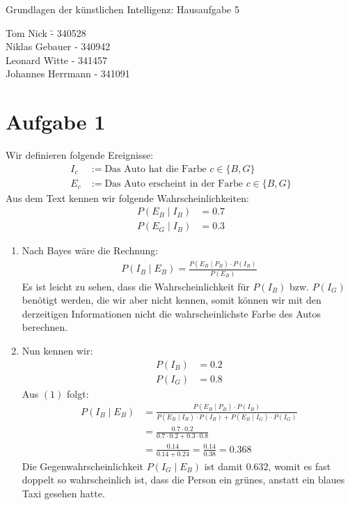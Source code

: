 \documentclass[a4paper,10pt]{article}
\begin{document}
\begin{center}
\Large{Grundlagen der künstlichen Intelligenz: Hausaufgabe 5} \\
\end{center}
\begin{tabbing}
Tom Nick \hspace{2cm}\= - 340528\\
Niklas Gebauer \> - 340942 \\
Leonard Witte \> - 341457 \\
Johannes Herrmann \> - 341091\\
\end{tabbing}

\section*{Aufgabe 1}
    Wir definieren folgende Ereignisse:
    \begin{align*}
        I_c &:= \text{Das Auto hat die Farbe $c \in \{B,G\}$} \\
        E_c &:= \text{Das Auto erscheint in der Farbe $c \in \{B, G\}$}
    \end{align*}
    Aus dem Text kennen wir folgende Wahrscheinlichkeiten:
    \begin{align*}
        P(E_B \mid I_B) &= 0.7 \\
        P(E_G \mid I_B) &= 0.3
    \end{align*}
    \begin{enumerate}[~~a.)]
        \item Nach Bayes wäre die Rechnung:
        \begin{align}
            P(I_B \mid E_B) = \frac{P(E_B\mid P_B) \cdot P(I_B)}{P(E_B)}
        \end{align}
        Es ist leicht zu sehen, dass die Wahrscheinlichkeit für $P(I_B)$ bzw. $P(I_G)$ benötigt werden, die wir aber nicht kennen, somit können wir mit den derzeitigen Informationen nicht die wahrscheinlichste Farbe des Autos berechnen.
        \item Nun kennen wir:
        \begin{align*}
            P(I_B) &= 0.2 \\
            P(I_G) &= 0.8
        \end{align*}
        Aus $(1)$ folgt:
        \begin{align*}
            P(I_B \mid E_B) &= \frac{P(E_B\mid P_B) \cdot P(I_B)}{P(E_B \mid I_B) \cdot P(I_B) + P(E_B \mid I_G) \cdot P(I_G)} \\
            &= \frac{0.7 \cdot 0.2}{0.7 \cdot 0.2 + 0.3 \cdot 0.8} \\
            &= \frac{0.14}{0.14 + 0.24} = \frac{0.14}{0.38} = 0.368
        \end{align*}
        Die Gegenwahrscheinlichkeit $P(I_G \mid E_B)$ ist damit $0.632$, womit es fast doppelt so wahrscheinlich ist, dass die Person ein grünes, anstatt ein blaues Taxi gesehen hatte.
    \end{enumerate}
\end{document}
